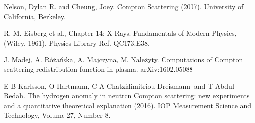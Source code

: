 \documentclass[%
 reprint,
 amsmath,amssymb,
 aps,
 pra,
]{revtex4-1}
\begin{document}
\begin{thebibliography}{6}
	Nelson, Dylan R. and  Cheung, Joey. Compton Scattering (2007). University of California,  Berkeley.
	
	R. M. Eisberg et al., Chapter 14: X-Rays. Fundamentals of Modern Physics,  (Wiley, 1961), Physics Library Ref. QC173.E38.
	
	J. Madej, A. Różańska, A. Majczyna, M. Należyty. Computations of Compton scattering redistribution function in plasma. arXiv:1602.05088
	
	E B Karlsson, O Hartmann, C A Chatzidimitriou-Dreismann, and T Abdul-Redah. The hydrogen anomaly in neutron Compton scattering: new experiments and a quantitative theoretical explanation (2016). IOP Measurement Science and Technology, Volume 27, Number 8.


\end{thebibliography}
\end{document}
